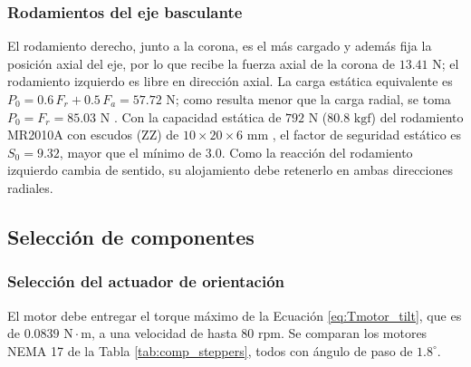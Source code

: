\documentclass[../../General.tex]{subfiles}
\begin{document}
\subsubsection{Rodamientos del eje basculante}

El rodamiento derecho, junto a la corona, es el más cargado y además fija la posición axial del eje, por lo que recibe la fuerza axial de la corona de $13.41\text{ N}$; el rodamiento izquierdo es libre en dirección axial. La carga estática equivalente es $P_0 = 0.6\,F_r + 0.5\,F_a = 57.72\text{ N}$; como resulta menor que la carga radial, se toma $P_0 = F_r = 85.03\text{ N}$ \citep{skf2020bearings}. Con la capacidad estática de $792\text{ N}$ ($80.8\text{ kgf}$) del rodamiento MR2010A con escudos (ZZ) de $10\times20\times6\text{ mm}$ \citep{mr2010a_bearing}, el factor de seguridad estático es $S_0 = 9.32$, mayor que el mínimo de $3.0$. Como la reacción del rodamiento izquierdo cambia de sentido, su alojamiento debe retenerlo en ambas direcciones radiales.

\subsection{Selección de componentes}

\subsubsection{Selección del actuador de orientación}

El motor debe entregar el torque máximo de la Ecuación \ref{eq:Tmotor_tilt}, que es de $0.0839\text{ N}\cdot\text{m}$, a una velocidad de hasta $80\text{ rpm}$. Se comparan los motores NEMA 17 de la Tabla \ref{tab:comp_steppers}, todos con ángulo de paso de $1.8^\circ$.
\end{document}
